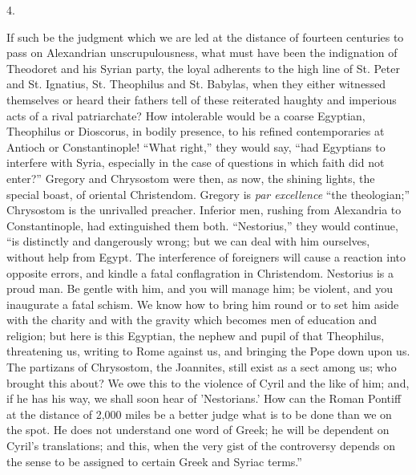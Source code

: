4.

If such be the judgment which we are led at the distance of
fourteen centuries to pass on Alexandrian unscrupulousness, what must
have been the indignation of Theodoret and his Syrian party, the loyal
adherents to the high line of St. Peter and St. Ignatius, St.
Theophilus and St. Babylas, when they either witnessed themselves or
heard their fathers tell of these reiterated haughty and imperious
acts of a rival patriarchate? How intolerable would be a coarse
Egyptian, Theophilus or Dioscorus, in bodily presence, to his refined
contemporaries at Antioch or Constantinople! ``What right,''
they would say, ``had Egyptians to interfere with Syria,
especially in the case of questions in which faith did not
enter?'' Gregory and Chrysostom were then, as now, the shining
lights, the special boast, of oriental Christendom. Gregory is \emph{par
excellence} ``the theologian;'' Chrysostom is the
unrivalled preacher. Inferior men, rushing from Alexandria to
Constantinople, had extinguished them both. ``Nestorius,''
they would continue, ``is distinctly and dangerously wrong; but we
can deal with him ourselves, without help from Egypt. The interference
of foreigners will cause a reaction into opposite errors, and kindle a
fatal conflagration in Christendom. Nestorius is a proud man. Be
gentle with him, and you will manage him; be violent, and you
inaugurate a fatal schism. We know how to bring him round or to set
him aside with the charity and with the gravity which becomes men of
education and religion; but here is this Egyptian, the nephew and
pupil of that Theophilus, threatening us, writing to Rome against
us, and bringing the Pope down upon us. The partizans of
Chrysostom, the Joannites, still exist as a sect among us; who brought
this about? We owe this to the violence of Cyril and the like of him;
and, if he has his way, we shall soon hear of 'Nestorians.' How can
the Roman Pontiff at the distance of 2,000 miles be a better judge
what is to be done than we on the spot. He does not understand one
word of Greek; he will be dependent on Cyril's translations; and this,
when the very gist of the controversy depends on the sense to be
assigned to certain Greek and Syriac terms.''

